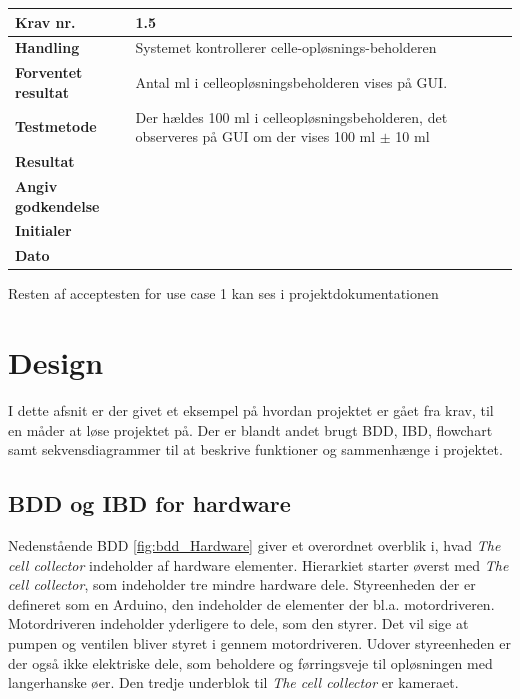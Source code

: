 	\begin{center}
		\begin{longtable}{ | m{4cm}| m{8.5cm}|} 
			\hline
			\textbf{Krav nr.} & 1.5    \\ 
			\hline
			\textbf{Handling} &  Systemet kontrollerer celle-opløsnings-beholderen  \\
			\hline
			\textbf{Forventet resultat} &  Antal ml i celleopløsningsbeholderen vises på GUI.  \\
			\hline
			\textbf{Testmetode}  & Der hældes 100 ml i celleopløsningsbeholderen, det observeres på GUI om der vises 100 ml $\pm$ 10 ml   \\
			\hline			
			\textbf{Resultat}  &    \\
			\hline
			\textbf{Angiv godkendelse} &     \\
			\hline
			\textbf{Initialer} &     \\
			\hline
			\textbf{Dato} &    \\
			\hline
		\end{longtable}
	\end{center}	
	
Resten af acceptesten for use case 1 kan ses i projektdokumentationen  

\section{Design}
\label{subsec:design}
I dette afsnit er der givet et eksempel på hvordan projektet er gået fra krav, til en måder at løse projektet på. Der er blandt andet brugt BDD, IBD, flowchart samt sekvensdiagrammer til at beskrive funktioner og sammenhænge i projektet. 

\subsection{BDD og IBD for hardware}
Nedenstående BDD \ref{fig:bdd_Hardware} giver et overordnet overblik i, hvad \textit{The cell collector} indeholder af hardware elementer. Hierarkiet starter øverst med \textit{The cell collector}, som indeholder tre mindre hardware dele. Styreenheden der er defineret som en Arduino, den indeholder de elementer der bl.a. motordriveren. Motordriveren indeholder yderligere to dele, som den styrer. Det vil sige at pumpen og ventilen bliver styret i gennem motordriveren. Udover styreenheden er der også ikke elektriske dele, som beholdere og førringsveje til opløsningen med langerhanske øer. Den tredje underblok til \textit{The cell collector} er kameraet.

